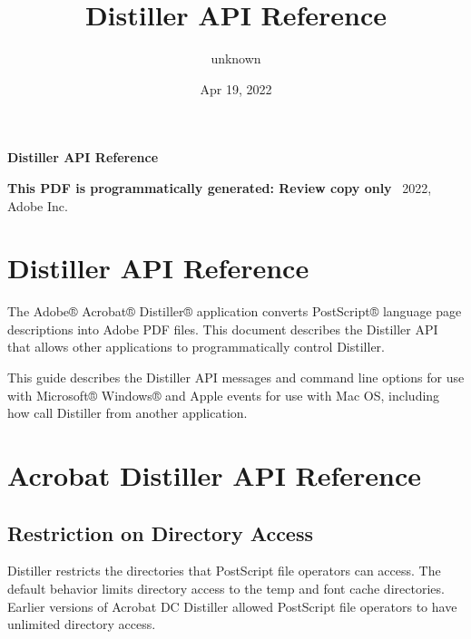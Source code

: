 \documentclass[letterpaper,12pt,english,openany,oneside]{sphinxmanual}
\title{Distiller API Reference}
\date{Apr 19, 2022}
\author{unknown}
\begin{document}
\pagestyle{empty}

    \begin{titlepage}
        \begin{figure}[h]
        \end{figure}
        \centering
        \vspace*{40mm}
        \textbf{\Huge Distiller API Reference}

        \vspace{15mm}
        \Large \textbf{{This PDF is programmatically generated: Review copy only}}
        \vfill
        \small \textcopyright\ 2022, Adobe Inc.
    \end{titlepage}
    \clearpage
    \tableofcontents
    \clearpage
    
\pagestyle{plain}

\pagestyle{normal}
\label{\detokenize{toc::doc}}



\chapter{Distiller API Reference}
\label{\detokenize{index:distiller-api-reference}}\label{\detokenize{index::doc}}
The Adobe® Acrobat® Distiller® application converts PostScript® language page descriptions into Adobe PDF files. This document describes the Distiller API that allows other applications to programmatically control Distiller.

This guide describes the Distiller API messages and command line options for use with Microsoft® Windows® and Apple events for use with Mac OS, including how call Distiller from another application.


\chapter{Acrobat Distiller API Reference}
\label{\detokenize{Distiller_AutomationIntro:acrobat-distiller-api-reference}}\label{\detokenize{Distiller_AutomationIntro::doc}}

\section{Restriction on Directory Access}
\label{\detokenize{Distiller_AutomationIntro:restriction-on-directory-access}}
Distiller restricts the directories that PostScript file operators can access. The default behavior limits directory access to the temp and font cache directories. Earlier versions of Acrobat DC Distiller allowed PostScript file operators to have unlimited directory access.
\end{document}

